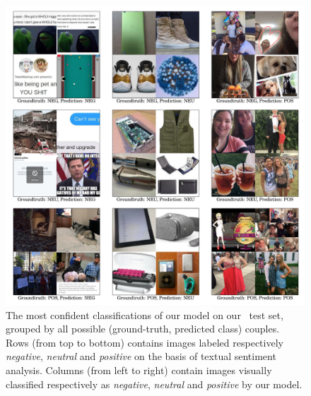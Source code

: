 \begin{figure}
\centering
\includegraphics[width=\linewidth]{confusion-images}
\caption{The most confident classifications of our model on our \BTSA\, test set, grouped by all possible (ground-truth, predicted class) couples. Rows (from top to bottom) contains images labeled respectively \emph{negative}, \emph{neutral} and \emph{positive} on the basis of textual sentiment analysis.
Columns (from left to right) contain images visually classified respectively as \emph{negative}, \emph{neutral} and \emph{positive} by our model.
}
\label{fig:vsa:confusion-images}
\end{figure}

